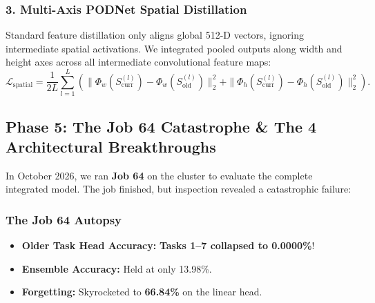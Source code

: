 \documentclass[11pt,a4paper]{article}
\begin{document}
    \subsubsection{3. Multi-Axis PODNet Spatial Distillation}
    Standard feature distillation only aligns global 512-D vectors, ignoring intermediate spatial activations. We integrated pooled outputs along width and height axes across all intermediate convolutional feature maps:
    \begin{equation}
        \mathcal{L}_{\text{spatial}} = \frac{1}{2L} \sum_{l=1}^{L} \left( \| \Phi_w(S_{\text{curr}}^{(l)}) - \Phi_w(S_{\text{old}}^{(l)}) \|_2^2 + \| \Phi_h(S_{\text{curr}}^{(l)}) - \Phi_h(S_{\text{old}}^{(l)}) \|_2^2 \right).
    \end{equation}

    \subsection{Phase 5: The Job 64 Catastrophe \& The 4 Architectural Breakthroughs}
    In October 2026, we ran \textbf{Job 64} on the cluster to evaluate the complete integrated model. The job finished, but inspection revealed a catastrophic failure:

    \subsubsection{The Job 64 Autopsy}
    \begin{itemize}[leftmargin=*]
        \item \textbf{Older Task Head Accuracy:} \textbf{Tasks 1--7 collapsed to 0.0000\%}!
        \item \textbf{Ensemble Accuracy:} Held at only 13.98\%.
        \item \textbf{Forgetting:} Skyrocketed to \textbf{66.84\%} on the linear head.
    \end{itemize}
\end{document}
